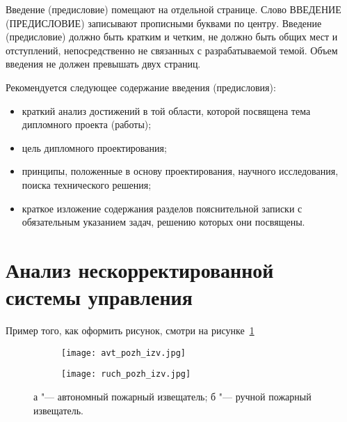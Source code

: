 \label{sec:intro}
Введение (предисловие) помещают на отдельной странице. 
Слово ВВЕДЕНИЕ (ПРЕДИСЛОВИЕ) записывают прописными буквами по центру.
Введение (предисловие) должно быть кратким и четким, не должно быть общих мест и отступлений, непосредственно не связанных с разрабатываемой темой.
Объем введения не должен превышать двух страниц.

Рекомендуется следующее содержание введения (предисловия):
\begin{itemize}
  \item краткий анализ достижений в той области, которой посвящена тема дипломного проекта (работы);
  \item цель дипломного проектирования;
  \item принципы, положенные в основу проектирования, научного исследования, поиска технического решения;
  \item краткое изложение содержания разделов пояснительной записки с обязательным указанием задач, решению которых они посвящены.
\end{itemize}

\section{Анализ нескорректированной системы управления}
\label{sec:analysys_equations}
Пример того, как оформить рисунок, смотри на рисунке~\ref{fig:fire_alarms}
\begin{figure}[ht]
\centering
  \begin{subfigure}[b]{0.45\textwidth} 
    \centering
    \texttt{[image: avt\_pozh\_izv.jpg]}  
    \caption{}
  \end{subfigure}
  \begin{subfigure}[b]{0.45\textwidth} 
    \centering
    \texttt{[image: ruch\_pozh\_izv.jpg]}  
    \caption{}
  \end{subfigure}
  \caption{ а  "--- автономный пожарный извещатель;
            б  "--- ручной пожарный извещатель.}
  \label{fig:fire_alarms}
\end{figure}


